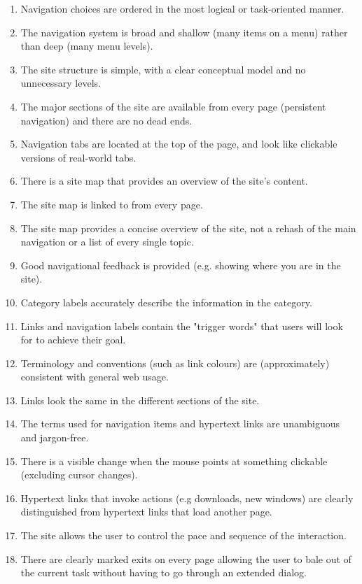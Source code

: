 \begin{itemize}
\begin{enumerate}
        \item Navigation choices are ordered in the most logical or task-oriented manner.
        \item The navigation system is broad and shallow (many items on a menu) rather than deep (many menu levels).
        \item The site structure is simple, with a clear conceptual model and no unnecessary levels.
        \item The major sections of the site are available from every page (persistent navigation) and there are no dead ends.
        \item Navigation tabs are located at the top of the page, and look like clickable versions of real-world tabs.
        \item There is a site map that provides an overview of the site's content.
        \item The site map is linked to from every page.
        \item The site map provides a concise overview of the site, not a rehash of the main navigation or a list of every single topic.
        \item Good navigational feedback is provided (e.g. showing where you are in the site).
        \item Category labels accurately describe the information in the category.
        \item Links and navigation labels contain the "trigger words" that users will look for to achieve their goal.
        \item Terminology and conventions (such as link colours) are (approximately) consistent with general web usage.
        \item Links look the same in the different sections of the site.
        \item The terms used for navigation items and hypertext links are unambiguous and jargon-free.
        \item There is a visible change when the mouse points at something clickable (excluding cursor changes).
        \item Hypertext links that invoke actions (e.g downloads, new windows) are clearly distinguished from hypertext links that load another page.
        \item The site allows the user to control the pace and sequence of the interaction.
        \item There are clearly marked exits on every page allowing the user to bale out of the current task without having to go through an extended dialog.

\end{enumerate}
\end{itemize}
